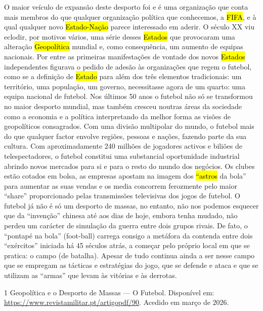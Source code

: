 \documentclass[a4paper,12pt]{article}
\begin{document}
 O maior veículo de expansão deste desporto foi e é uma organização que conta mais membros do que qualquer organização política que conhecemos, a \hl{FIFA}, e à qual qualquer novo \hl{Estado-Nação} parece interessado em aderir. O século XX viu eclodir, por motivos vários, uma série desses \hl{Estados} que provocaram uma alteração \hl{Geopolítica} mundial e, como consequência, um aumento de equipas nacionais. Por entre as primeiras manifestações de vontade dos novos \hl{Estados} independentes figurava o pedido de adesão às organizações que regem o futebol, como se a definição de \hl{Estado} para além dos três elementos tradicionais: um território, uma população, um governo, necessitasse agora de um quarto: uma equipa nacional de futebol.
 Nos últimos 50 anos o futebol não só se transformou no maior desporto mundial, mas também cresceu noutras áreas da sociedade como a economia e a política interpretando da melhor forma as visões de geopolíticos consagrados. Com uma divisão multipolar do mundo, o futebol mais do que qualquer factor envolve regiões, pessoas e nações, fazendo parte da sua cultura.
 Com aproximadamente 240 milhões de jogadores activos e biliões de telespectadores, o futebol constitui uma substancial oportunidade industrial abrindo novos mercados para si e para o resto do mundo dos negócios. Os clubes estão cotados em bolsa, as empresas apostam na imagem dos \hl{“astros} da bola” para aumentar as suas vendas e os media concorrem ferozmente pelo maior “share” proporcionado pelas transmissões televisivas dos jogos de futebol.
 O futebol já não é só um desporto de massas, no entanto, não nos podemos esquecer que da “invenção” chinesa até aos dias de hoje, embora tenha mudado, não perdeu um carácter de simulação da guerra entre dois grupos rivais. De fato, o “pontapé na bola”
(foot-ball) carrega consigo a metáfora da contenda entre dois “exércitos” iniciada há 45 séculos atrás, a começar pelo próprio local em que se pratica: o campo (de batalha).
 Apesar de tudo continua ainda a ser nesse campo que se empregam as tácticas e estratégias do jogo, que se defende e ataca e que se utilizam as “armas” que levam às vitórias e às derrotas.


\begin{thebibliography}{1}
  Geopolítica e o Desporto de Massas --- O Futebol.
  Disponível em: \url{https://www.revistamilitar.pt/artigopdf/90}.
  Acedido em março de 2026.
\end{thebibliography}
\end{document}

